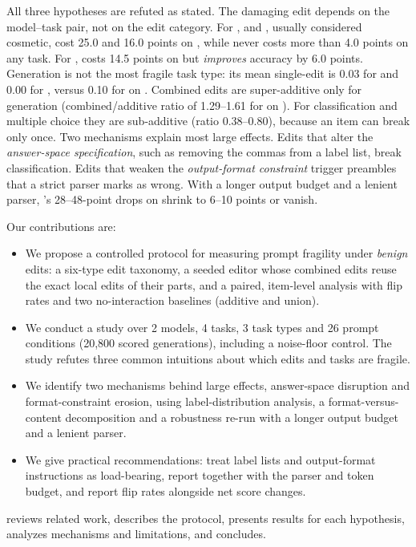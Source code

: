 All three hypotheses are refuted as stated. The damaging edit depends on the model--task pair, not on the edit category. For \qwen, \caps and \punct, usually considered cosmetic, cost 25.0 and 16.0 points on \agnews, while \reord never costs more than 4.0 points on any task. For \llama, \syn costs 14.5 points on \arc but \emph{improves} \sst accuracy by 6.0 points. Generation is not the most fragile task type: its mean single-edit \pfi is 0.03 for \qwen and 0.00 for \llama, versus 0.10 for \qwen on \agnews. Combined edits are super-additive only for generation (combined/additive ratio of 1.29--1.61 for \qwen on \squad). For classification and multiple choice they are sub-additive (ratio 0.38--0.80), because an item can break only once. Two mechanisms explain most large effects. Edits that alter the \emph{answer-space specification}, such as removing the commas from a label list, break classification. Edits that weaken the \emph{output-format constraint} trigger preambles that a strict parser marks as wrong. With a longer output budget and a lenient parser, \llama's 28--48-point drops on \arc shrink to 6--10 points or vanish.

Our contributions are:
\begin{itemize}[leftmargin=*,itemsep=0pt,topsep=0pt]
    \item We propose a controlled protocol for measuring prompt fragility under \emph{benign} edits: a six-type edit taxonomy, a seeded editor whose combined edits reuse the exact local edits of their parts, and a paired, item-level analysis with flip rates and two no-interaction baselines (additive and union).
    \item We conduct a study over 2 models, 4 tasks, 3 task types and 26 prompt conditions (20,800 scored generations), including a noise-floor control. The study refutes three common intuitions about which edits and tasks are fragile.
    \item We identify two mechanisms behind large effects, answer-space disruption and format-constraint erosion, using label-distribution analysis, a format-versus-content decomposition and a robustness re-run with a longer output budget and a lenient parser.
    \item We give practical recommendations: treat label lists and output-format instructions as load-bearing, report \pfi together with the parser and token budget, and report flip rates alongside net score changes.
\end{itemize}

 reviews related work,  describes the protocol,  presents results for each hypothesis,  analyzes mechanisms and limitations, and  concludes.

